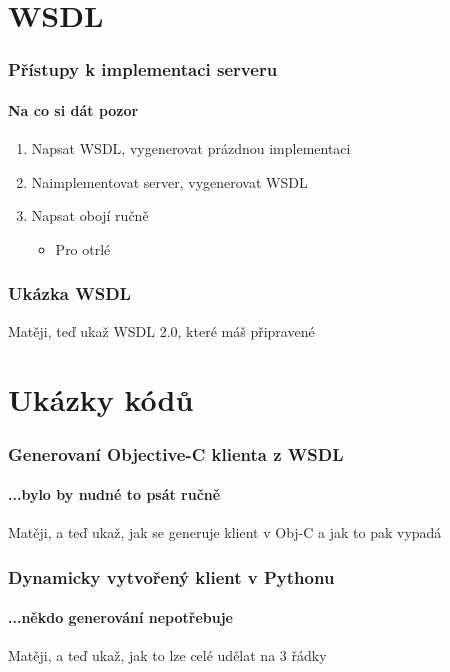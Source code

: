 \documentclass[12pt]{beamer}
\begin{document}
\section{WSDL}

\begin{frame}
  \frametitle{Přístupy k implementaci serveru}
  \framesubtitle{Na co si dát pozor}

  \begin{enumerate}
    \item Napsat WSDL, vygenerovat prázdnou implementaci
    \vspace{4mm}
    \item Naimplementovat server, vygenerovat WSDL
    \vspace{4mm}
    \item Napsat obojí ručně
    \begin{itemize}
      \item Pro otrlé
    \end{itemize}
  \end{enumerate}
\end{frame}

\begin{frame}
  \frametitle{Ukázka WSDL}

  \begin{example}
    Matěji, teď ukaž WSDL 2.0, které máš připravené
  \end{example}
\end{frame}

\section{Ukázky kódů}

\begin{frame}
  \frametitle{Generovaní Objective-C klienta z WSDL}
  \framesubtitle{...bylo by nudné to psát ručně}

  \begin{example}
    Matěji, a teď ukaž, jak se generuje klient v Obj-C a jak to pak vypadá
  \end{example}
\end{frame}

\begin{frame}
  \frametitle{Dynamicky vytvořený klient v Pythonu}
  \framesubtitle{...někdo generování nepotřebuje}

  \begin{example}
    Matěji, a teď ukaž, jak to lze celé udělat na 3 řádky
  \end{example}
\end{frame}
\end{document}
